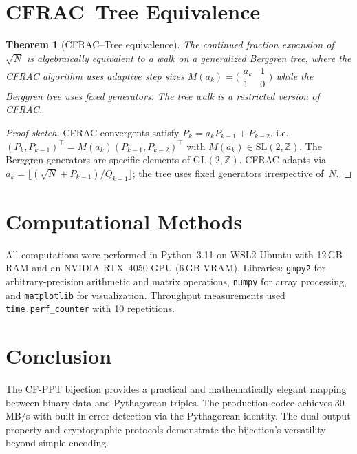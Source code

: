 \documentclass[12pt]{amsart}
\newtheorem{theorem}{Theorem}[section]
\theoremstyle{definition}
\theoremstyle{remark}
\begin{document}
\section{CFRAC--Tree Equivalence}\label{sec:cfrac}

\begin{theorem}[CFRAC--Tree equivalence]\label{thm:cfrac}
The continued fraction expansion of $\sqrt{N}$ is algebraically equivalent to
a walk on a generalized Berggren tree, where the CFRAC algorithm uses adaptive
step sizes $M(a_k) = \bigl(\begin{smallmatrix} a_k & 1 \\ 1 & 0
\end{smallmatrix}\bigr)$ while the Berggren tree uses fixed generators.
The tree walk is a restricted version of CFRAC.
\end{theorem}

\begin{proof}[Proof sketch]
CFRAC convergents satisfy $P_k = a_k P_{k-1} + P_{k-2}$, i.e.,
$(P_k, P_{k-1})^\top = M(a_k)(P_{k-1}, P_{k-2})^\top$ with
$M(a_k) \in \mathrm{SL}(2, \mathbb{Z})$. The Berggren generators are
specific elements of $\mathrm{GL}(2, \mathbb{Z})$. CFRAC adapts via
$a_k = \lfloor(\sqrt{N} + P_{k-1})/Q_{k-1}\rfloor$; the tree uses fixed
generators irrespective of~$N$.
\end{proof}

\section{Computational Methods}\label{sec:computational}

All computations were performed in Python~3.11 on WSL2 Ubuntu with 12\,GB
RAM and an NVIDIA RTX~4050 GPU (6\,GB VRAM). Libraries: \texttt{gmpy2} for
arbitrary-precision arithmetic and matrix operations, \texttt{numpy} for
array processing, and \texttt{matplotlib} for visualization. Throughput
measurements used \texttt{time.perf\_counter} with 10 repetitions.

\section{Conclusion}\label{sec:conclusion}

The CF-PPT bijection provides a practical and mathematically elegant mapping
between binary data and Pythagorean triples. The production codec achieves
30\,MB/s with built-in error detection via the Pythagorean identity. The
dual-output property and cryptographic protocols demonstrate the bijection's
versatility beyond simple encoding.
\end{document}
